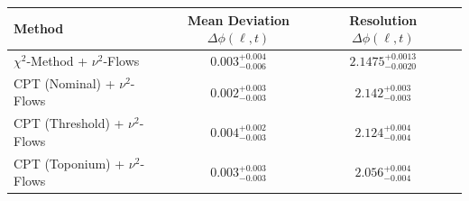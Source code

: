     \begin{tabular}{lccc}
        \toprule
        Method & Mean Deviation $\Delta\phi(\ell, t)$ & Resolution $\Delta\phi(\ell, t)$ \\
        \midrule
        $\chi^2$-Method + $\nu^2$-Flows & $0.003^{+0.004}_{-0.006}$ & $2.1475^{+0.0013}_{-0.0020}$ \\
        CPT (Nominal) + $\nu^2$-Flows & $0.002^{+0.003}_{-0.003}$ & $2.142^{+0.003}_{-0.003}$ \\
        CPT (Threshold) + $\nu^2$-Flows & $0.004^{+0.002}_{-0.003}$ & $2.124^{+0.004}_{-0.004}$ \\
        CPT (Toponium) + $\nu^2$-Flows & $0.003^{+0.003}_{-0.003}$ & $2.056^{+0.004}_{-0.004}$ \\
        \bottomrule
    \end{tabular}